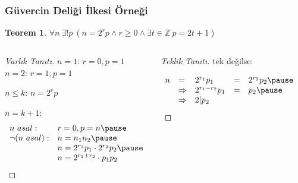 \documentclass[dvipsnames]{beamer}
\theoremstyle{definition}
\theoremstyle{example}
\theoremstyle{plain}
\newtheorem{teorem}[theorem]{Teorem}
\begin{document}
\begin{frame}
  \frametitle{Güvercin Deliği İlkesi Örneği}

  \begin{teorem}
    $\forall n~\exists ! p~
      (n = 2^r p \wedge r \geq 0 \wedge \exists t \in \mathbb Z~p = 2t + 1)$\\
  \end{teorem}

  \pause
  \begin{columns}[t]
    \begin{proof}[Varlık Tanıtı]
      $n = 1$: $r = 0, p = 1$\\
      $n = 2$: $r = 1, p = 1$

      \pause
      $n \leq k$: $n = 2^r p$

      \pause
      $n = k + 1$:
      \[
        \begin{array}{ll}
          n~asal:        & r = 0, p = n\pause\\
          \neg (n~asal): & n = n_1 n_2\pause\\
                          & n = 2^{r_1} p_1 \cdot 2^{r_2} p_2\pause\\
                          & n = 2^{r_1+r_2} \cdot p_1 p_2
        \end{array}
      \]
    \end{proof}

    \pause
    \begin{proof}[Teklik Tanıtı]
      tek değilse:

      \pause
      \[
        \begin{array}{lllll}
          n & =           & 2^{r_1} p_1     & = & 2^{r_2} p_2\pause\\
            & \Rightarrow & 2^{r_1-r_2} p_1 & = & p_2\pause\\
            & \Rightarrow & 2 | p_2
        \end{array}
      \]
    \end{proof}
  \end{columns}
\end{frame}
\end{document}
